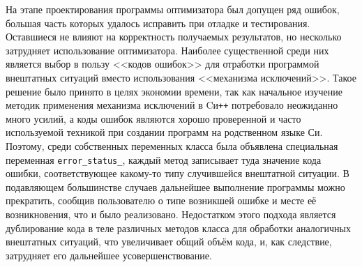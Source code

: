 На этапе проектирования программы оптимизатора был допущен ряд ошибок,
большая часть которых удалось исправить при отладке и
тестирования. Оставшиеся не влияют на корректность получаемых
результатов, но несколько затрудняет использование оптимизатора.
Наиболее существенной среди них является выбор в пользу <<кодов
ошибок>> для отработки программой внештатных ситуаций вместо
использования <<механизма исключений>>.  Такое решение было принято в
целях экономии времени, так как начальное изучение методик применения
механизма исключений в Cи\texttt{++} потребовало неожиданно много
усилий, а коды ошибок являются хорошо проверенной и часто используемой
техникой при создании программ на родственном языке Си. Поэтому, среди
собственных переменных класса была объявлена специальная переменная
\verb+error_status_+, каждый метод записывает туда
значение кода ошибки, соответствующее какому-то типу случившейся
внештатной ситуации.  В подавляющем большинстве случаев дальнейшее
выполнение программы можно прекратить, сообщив пользователю о типе
возникшей ошибке и месте её возникновения, что и было
реализовано. Недостатком этого подхода является дублирование кода в
теле различных методов класса для обработки аналогичных внештатных
ситуаций, что увеличивает общий объём кода, и, как следствие,
затрудняет его дальнейшее усовершенствование.

